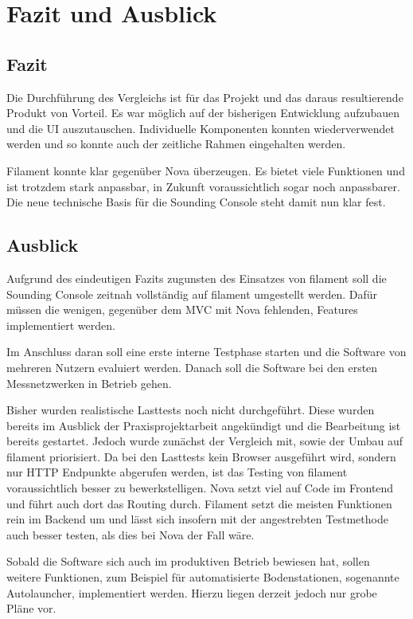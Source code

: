\newpage

\section{Fazit und Ausblick}

\subsection{Fazit}
Die Durchführung des Vergleichs ist für das Projekt und das daraus resultierende Produkt von Vorteil.
Es war möglich auf der bisherigen Entwicklung aufzubauen und die UI auszutauschen.
Individuelle Komponenten konnten wiederverwendet werden und so konnte auch der zeitliche Rahmen eingehalten werden.

Filament konnte klar gegenüber Nova überzeugen.
Es bietet viele Funktionen und ist trotzdem stark anpassbar, in Zukunft voraussichtlich sogar noch anpassbarer.
Die neue technische Basis für die Sounding Console steht damit nun klar fest.

\subsection{Ausblick}
Aufgrund des eindeutigen Fazits zugunsten des Einsatzes von filament soll die Sounding Console zeitnah vollständig auf filament umgestellt werden.
Dafür müssen die wenigen, gegenüber dem MVC mit Nova fehlenden, Features implementiert werden.

Im Anschluss daran soll eine erste interne Testphase starten und die Software von mehreren Nutzern evaluiert werden.
Danach soll die Software bei den ersten Messnetzwerken in Betrieb gehen.

Bisher wurden realistische Lasttests noch nicht durchgeführt.
Diese wurden bereits im Ausblick der Praxisprojektarbeit angekündigt und die Bearbeitung ist bereits gestartet.
Jedoch wurde zunächst der Vergleich mit, sowie der Umbau auf filament priorisiert.
Da bei den Lasttests kein Browser ausgeführt wird, sondern nur HTTP Endpunkte abgerufen werden, ist das Testing von filament voraussichtlich besser zu bewerkstelligen.
Nova setzt viel auf Code im Frontend und führt auch dort das Routing durch.
Filament setzt die meisten Funktionen rein im Backend um und lässt sich insofern mit der angestrebten Testmethode auch besser testen, als dies bei Nova der Fall wäre.

Sobald die Software sich auch im produktiven Betrieb bewiesen hat, sollen weitere Funktionen, zum Beispiel für automatisierte Bodenstationen, sogenannte Autolauncher, implementiert werden.
Hierzu liegen derzeit jedoch nur grobe Pläne vor.
